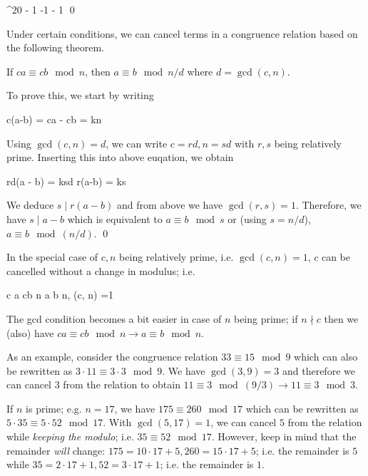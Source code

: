 ^{20} - 1   -1  - 1   \qed
\eee

Under certain conditions, we can cancel terms in a congruence relation based on the following theorem.

\begin{theorem}
    If $ca \equiv cb \mod n$, then $a \equiv b \mod n/d$ where $d = \gcd(c, n)$.
\end{theorem}

To prove this, we start by writing

\bee
c(a-b) = ca - cb = kn
\eee

Using $\gcd(c,n) = d$, we can write $c = rd, n = sd$ with $r, s$ being relatively prime. Inserting this into above euqation, we obtain

\bee
rd(a - b) = ksd \rightarrow r(a-b) = ks
\eee

We deduce $s \mid r(a-b)$ and from above we have $\gcd(r,s) = 1$. Therefore, we have $s \mid a-b$ which is equivalent to $a \equiv b \mod s$ or (using $s = n/d$), $a \equiv b \mod (n/d)$. \qed

In the special case of $c, n$ being relatively prime, i.e. $\gcd(c, n) = 1$, $c$ can be cancelled without a change in modulus; i.e.

\bee
c a \equiv cb \mod n \rightarrow a \equiv b \mod n, \quad {} \gcd(c, n) =1
\eee

The gcd condition becomes a bit easier in case of $n$ being prime; if $n \nmid c$ then we (also) have $c a \equiv cb \mod n \rightarrow a \equiv b \mod n$.

As an example, consider the congruence relation $33 \equiv 15 \mod 9$ which can also be rewritten as $3 \cdot 11 \equiv 3 \cdot 3 \mod 9$. We have $\gcd(3, 9) = 3$ and therefore we can cancel $3$ from the relation to obtain $11 \equiv 3 \mod (9/3) \rightarrow 11 \equiv 3 \mod 3$.

If $n$ is prime; e.g. $n = 17$, we have $175 \equiv 260 \mod 17$ which can be rewritten as $5 \cdot 35 \equiv 5 \cdot 52 \mod 17$. With $\gcd(5, 17) = 1$, we can cancel $5$ from the relation while \emph{keeping the modulo}; i.e. $35 \equiv 52 \mod 17$. However, keep in mind that the remainder \emph{will} change: $175 = 10 \cdot 17 + 5, 260 = 15 \cdot 17 + 5$; i.e. the remainder is $5$ while $35 = 2 \cdot 17 + 1, 52 = 3 \cdot 17 + 1$; i.e. the remainder is $1$.


